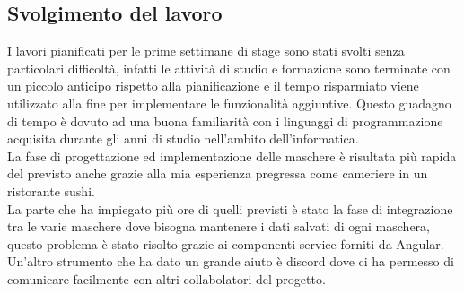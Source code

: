 \subsection{Svolgimento del lavoro}
I lavori pianificati per le prime settimane di stage sono stati svolti senza particolari difficoltà, infatti le attività di studio e formazione sono terminate con un piccolo anticipo rispetto alla pianificazione e il tempo risparmiato viene utilizzato alla fine per implementare le funzionalità aggiuntive. Questo guadagno di tempo è dovuto ad una buona familiarità con i linguaggi di programmazione acquisita durante gli anni di studio nell'ambito dell'informatica.\\
La fase di progettazione ed implementazione delle maschere è risultata più rapida del previsto anche grazie alla mia esperienza pregressa come cameriere in un ristorante sushi.\\
La parte che ha impiegato più ore di quelli previsti è stato la fase di integrazione tra le varie maschere dove bisogna mantenere i dati salvati di ogni maschera, questo problema è stato risolto grazie ai componenti service forniti da Angular. Un'altro strumento che ha dato un grande aiuto è discord dove ci ha permesso di comunicare facilmente con altri collabolatori del progetto.\\
